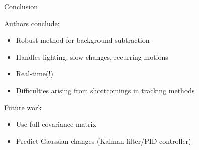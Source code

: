 \documentclass{beamer}
\begin{document}
\begin{frame}{Conclusion}

Authors conclude:
\begin{itemize}
\item Robust method for background subtraction
\item Handles lighting, slow changes, recurring motions
\item Real-time(!)
\item Difficulties arising from shortcomings in tracking methods
\end{itemize}

Future work
\begin{itemize}
\item Use full covariance matrix
\item Predict Gaussian changes (Kalman filter/PID controller)
\end{itemize}
\end{frame}

\end{document}
